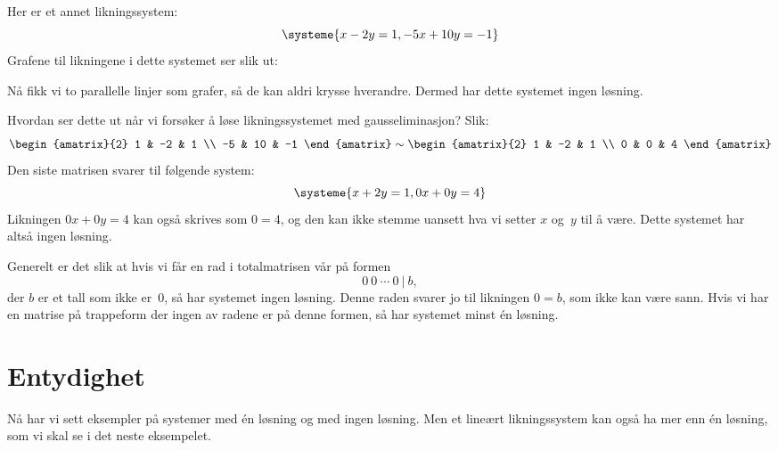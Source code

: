 Her er et annet likningssystem:
\[
\systeme{
   x -  2 y = 1,
-5 x + 10 y = -1
}
\]
Grafene til likningene i dette systemet ser slik ut:
\begin{center}
\end{center}
Nå fikk vi to parallelle linjer som grafer, så de kan aldri krysse
hverandre.  Dermed har dette systemet ingen løsning.

Hvordan ser dette ut når vi forsøker å løse likningssystemet med
gausseliminasjon?  Slik:
\[
\begin{amatrix}{2}
 1 & -2 &  1 \\
-5 & 10 & -1
\end{amatrix}
\roweq
\begin{amatrix}{2}
1 & -2 & 1 \\
0 &  0 & 4
\end{amatrix}
\]
Den siste matrisen svarer til følgende system:
\[
\systeme{
  x + 2 y = 1,
0 x + 0 y = 4
}
\]
Likningen $0x + 0y = 4$ kan også skrives som $0 = 4$, og den kan ikke
stemme uansett hva vi setter $x$ og~$y$ til å være.  Dette systemet
har altså ingen løsning.

Generelt er det slik at hvis vi får en rad i totalmatrisen vår på
formen
\[
0\ 0\ \cdots\ 0\ |\ b,
\]
der $b$ er et tall som ikke er~$0$, så har systemet ingen løsning.
Denne raden svarer jo til likningen $0 = b$, som ikke kan være sann.
Hvis vi har en matrise på trappeform der ingen av radene er på denne
formen, så har systemet minst én løsning.


\section*{Entydighet}

Nå har vi sett eksempler på systemer med én løsning og med ingen
løsning.  Men et lineært likningssystem kan også ha mer enn én
løsning, som vi skal se i det neste eksempelet.

